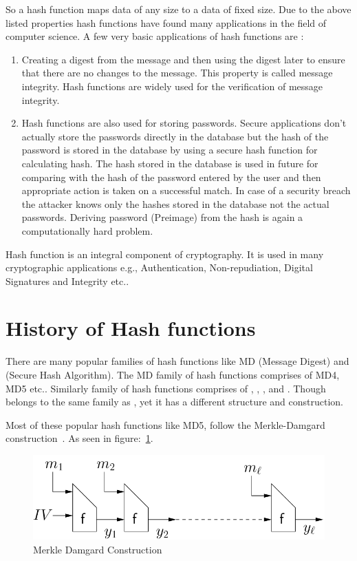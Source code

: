 So a hash function maps data of any size to a data of fixed size. Due to the above listed properties hash functions have found many applications in the field of computer science. A few very basic applications of hash functions are :
\begin{enumerate}
	\item Creating a digest from the message and then using the digest later to ensure that there are no changes to the message. This property is called message integrity. Hash functions are widely used for the verification of message integrity.
	\item Hash functions are also used for storing passwords. Secure applications don't actually store the passwords directly in the database but the hash of the password is stored in the database by using a secure hash function for calculating hash. The hash stored in the database is used in future for comparing with the hash of the password entered by the user and then appropriate action is taken on a successful match. In case of a security breach the attacker knows only the hashes stored in the database not the actual passwords. Deriving password (Preimage) from the hash is again a computationally hard problem.
\end{enumerate}

Hash function is an integral component of cryptography. It is used in many cryptographic applications e.g., Authentication, Non-repudiation, Digital Signatures and Integrity etc..

\section{History of Hash functions}

There are many popular families of hash functions like MD (Message Digest) and \SHA(Secure Hash Algorithm). The MD family of hash functions comprises of MD4, MD5 etc.. Similarly \SHA{} family of hash functions comprises of , , , and .
Though  belongs to the same family as , yet it has a different structure and construction.

Most of these popular hash functions like MD5,  follow the Merkle-Damgard construction~\cite{merkle}. As seen in figure:~\ref{MDConstruction}.

\begin{figure}
    \centering
    \includegraphics[scale=0.5]{MDConstruction.png}
    \caption{Merkle Damgard Construction~\cite{MDamgard}}
    \label{MDConstruction}
\end{figure}

